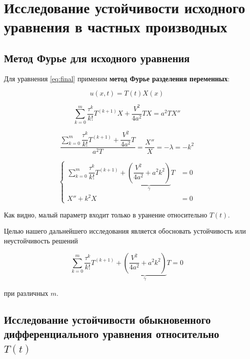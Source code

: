 \section{Исследование устойчивости исходного уравнения в частных производных}

\subsection{Метод Фурье для исходного уравнения}

Для уравнения \ref{eq:final} применим \textbf{метод Фурье разделения переменных}:

\begin{equation*}
u(x,t) = T(t) X(x)
\end{equation*}

\begin{equation*}
\sum\limits_{k=0}^{m} \dfrac{\tau^k}{k!} T^{(k+1)} X + \dfrac{V^2}{4a^2} T X =a^2 T X''
\end{equation*}

\begin{equation*}
\dfrac{\sum\limits_{k=0}^{m} \dfrac{\tau^k}{k!} T^{(k+1)} + \dfrac{V^2}{4a^2} T}{a^2 T} = \dfrac{X''}{X} = -\lambda = -k^2
\end{equation*}

\begin{equation}
\left\{
\begin{aligned}
\sum\limits_{k=0}^{m} \dfrac{\tau^k}{k!} T^{(k+1)} + \underbrace{ \left( \dfrac{V^2}{4a^2} + a^2 k^2 \right)}_{\gamma} T & = 0\\
X'' + k^2 X & = 0
\end{aligned}
\right.
\end{equation}

Как видно, малый параметр входит только в уранение относительно $T(t)$.

Целью нашего дальнейшего исследования является обосновать устойчивость или неустойчивость решений 

\begin{equation*}
\sum\limits_{k=0}^{m} \dfrac{\tau^k}{k!} T^{(k+1)} + \underbrace{ \left( \dfrac{V^2}{4a^2} + a^2 k^2 \right)}_{\gamma} T = 0
\end{equation*}

при различных $m$.

\subsection{Исследование устойчивости обыкновенного дифференциального уравнения относительно $T(t)$}

